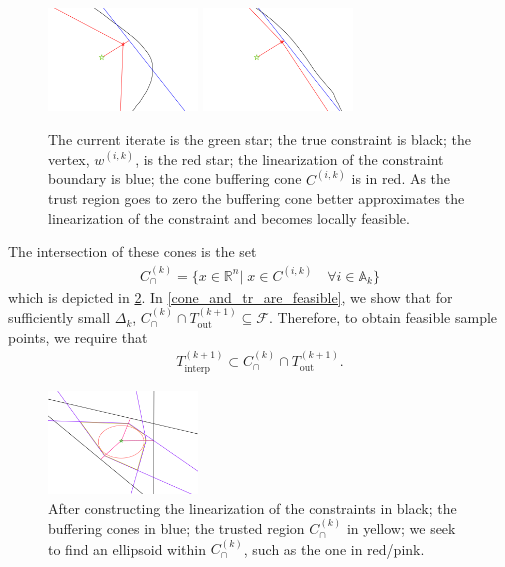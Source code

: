 \documentclass{article}
\theoremstyle{case}
\numberwithin{theorem}{subsection}
\newcommand{\activeconstraintsk}{{\mathbb A_{k}}}
\newcommand{\capcones}{{C^{(k)}_{\cap}}}
\newcommand{\dk}{\Delta_k}
\newcommand{\feasible}{{\mathcal F}}
\newcommand{\outertrkpo}{{T_{\text{out}}^{(k+1)}}}
\newcommand{\Rn}{\mathbb R^n}
\newcommand{\sampletrkpo}{{T_{\text{interp}}^{(k+1)}}}
\newcommand{\wik}{{w^{(i, k)}}}
\newcommand{\fik}{{C^{(i, k)}}}
\begin{document}
\begin{figure}[ht]
    \centering
    \includegraphics[width=150px]{images/explanation_2.png}
    \includegraphics[width=150px]{images/explanation_3.png}
    \caption{
    	The current iterate is the green star;
    	the true constraint is black;
    	the vertex, $\wik$, is the red star;
    	the linearization of the constraint boundary is blue;
    	the cone buffering cone $\fik$ is in red.
    	As the trust region goes to zero the buffering cone better approximates the linearization of the constraint and becomes locally feasible.
	}
    \label{explanation_2}
\end{figure}
The intersection of these cones is the set
\begin{align}
\capcones = \{x\in\Rn | \; x \in \fik \quad \forall i \in \activeconstraintsk \} \label{define_capcones}
\end{align}
which is depicted in \cref{completed_2}.
In \cref{cone_and_tr_are_feasible}, we show that for sufficiently small $\dk$, $\capcones \cap \outertrkpo \subseteq \feasible$.
Therefore, to obtain feasible sample points, we require that 
\begin{align*}
\sampletrkpo \subset \capcones \cap \outertrkpo.
\end{align*}


\begin{figure}[ht]
    \centering
    \includegraphics[width=150px]{images/completed_2.png}
    \caption{
    	After constructing 
    	the linearization of the constraints in black;
    	the buffering cones in blue;
    	the trusted region $\capcones$ in yellow;
    	we seek to find an ellipsoid within $\capcones$, such as the one in red/pink.
	}
    \label{completed_2}
\end{figure}
\end{document}
